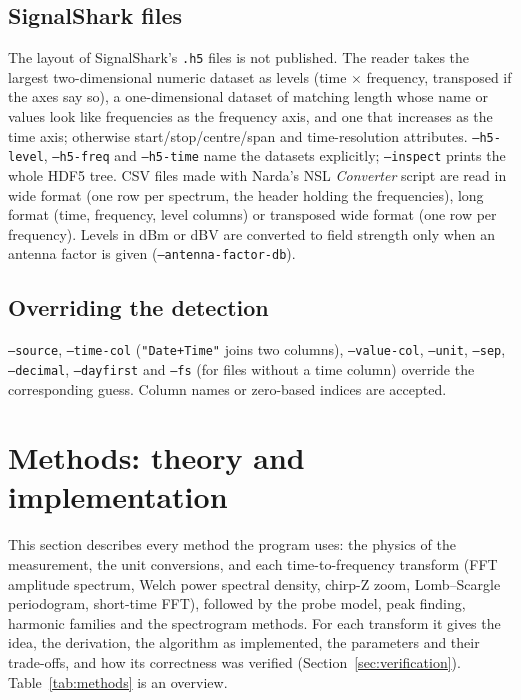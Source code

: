 \documentclass[10pt,letterpaper]{article}
\numberwithin{equation}{section}
\begin{document}
\subsection{SignalShark files}
The layout of SignalShark's \texttt{.h5} files is not published. The reader
takes the largest two-dimensional numeric dataset as levels (time $\times$
frequency, transposed if the axes say so), a one-dimensional dataset of matching
length whose name or values look like frequencies as the frequency axis, and one
that increases as the time axis; otherwise start/stop/centre/span and
time-resolution attributes. \texttt{--h5-level}, \texttt{--h5-freq} and
\texttt{--h5-time} name the datasets explicitly; \texttt{--inspect} prints the
whole HDF5 tree. CSV files made with Narda's NSL \emph{Converter} script
\cite{R8} are read in wide format (one row per spectrum, the header holding the
frequencies), long format (time, frequency, level columns) or transposed wide
format (one row per frequency). Levels in dBm or dB\textmu V are converted to
field strength only when an antenna factor is given (\texttt{--antenna-factor-db}).

\subsection{Overriding the detection}\label{sec:overrides}
\texttt{--source}, \texttt{--time-col} (\texttt{"Date+Time"} joins two columns),
\texttt{--value-col}, \texttt{--unit}, \texttt{--sep}, \texttt{--decimal},
\texttt{--dayfirst} and \texttt{--fs} (for files without a time column) override
the corresponding guess. Column names or zero-based indices are accepted.

\section{Methods: theory and implementation}\label{sec:theory}

This section describes every method the program uses: the physics of the
measurement, the unit conversions, and each time-to-frequency transform
(FFT amplitude spectrum, Welch power spectral density, chirp-Z zoom,
Lomb--Scargle periodogram, short-time FFT), followed by the probe model,
peak finding, harmonic families and the spectrogram methods. For each
transform it gives the idea, the derivation, the algorithm as implemented,
the parameters and their trade-offs, and how its correctness was verified
(Section~\ref{sec:verification}). Table~\ref{tab:methods} is an overview.
\end{document}
